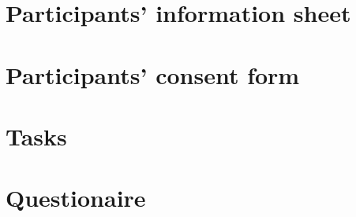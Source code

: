 \chapter{Participants' information sheet}


\chapter{Participants' consent form}


\chapter{Tasks}

\chapter{Questionaire}